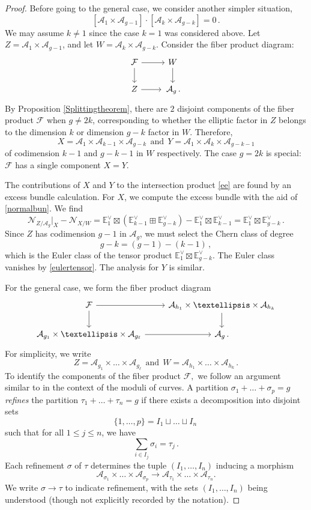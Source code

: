 \documentclass[11pt]{amsart}
\theoremstyle{definition}
\newcommand{\A}{\mathcal{A}}
\newcommand{\F}{\mathcal{F}}
\begin{document}
{\begin{proof}
Before going to the general case, we consider another simpler situation, 
\begin{equation}\label{ee}[\A_{1} \times \A_{g-1}] \cdot [\A_{k} \times \A_{g-k}] = 0\, .\end{equation} We may assume $k\neq 1$ since the case $k=1$ was considered above. Let $Z = \A_{1} \times \A_{g-1}$, and let $W =\A_{k} \times \A_{g-k}$. 
Consider the fiber product diagram:
\[
\begin{tikzcd}
\F \arrow[d] \arrow[r] & W\arrow[d] \\
Z \arrow[r]       & \, \A_g \, .                       
\end{tikzcd}
\]
 By Proposition \ref{Splittingtheorem}, there are $2$ disjoint components of the fiber product $\F$ when $g\neq 2k$, corresponding to whether the elliptic factor in $Z$ belongs to the dimension $k$ or dimension $g-k$ factor in $W$. Therefore, $$X=\A_{1}\times \A_{k-1}\times \A_{g-k} \ \  \text{and}\ \  Y=\A_{1}\times \A_{k}\times \A_{g-k-1}$$ of codimension $k-1$ and $g-k-1$ in $W$ respectively. The case $g=2k$ is special: $\F$ has a single component $X=Y$.

The contributions of $X$ and $Y$ to the intersection product \eqref{ee} are found by an excess bundle calculation. For $X$, we compute the excess bundle with the aid of \eqref{normalbun}. We find 
$$ \mathcal N_{Z/\A_g}\bigg|_X - \mathcal N_{X/W} = \mathbb E^{\vee}_1 \boxtimes (\mathbb E^{\vee}_{k-1} \boxplus\mathbb E^{\vee}_{g-k}) -\mathbb E^{\vee}_1 \boxtimes \mathbb E^{\vee}_{k-1} = \mathbb E^{\vee}_1 \boxtimes \mathbb E^{\vee}_{g-k}\,.$$ 
Since $Z$ has codimension $g-1$ in $\A_g$,
we must select the Chern class of degree 
$$g-k=(g-1)-(k-1)\, ,$$ which is the Euler class of the tensor product $\mathbb E_1^{\vee}\boxtimes \mathbb E_{g-k}^{\vee}$.
The Euler class vanishes by \eqref{eulertensor}. The analysis for $Y$ is similar. 


For the general case, we form the fiber product diagram \[
\begin{tikzcd}
\mathcal F\arrow[d] \arrow[r] & \A_{h_1}\times \ldots \times\A_{h_k}\arrow[d] \\
\A_{g_1} \times \ldots \times\A_{g_\ell}\arrow[r]       & \A_g \, .                       
\end{tikzcd}
\] For simplicity, we write $$Z=\A_{g_1} \times \ldots\times \A_{g_\ell}\ \ \text{and}\ \  W=\A_{h_1}\times \ldots \times \A_{h_k}\, .$$ To identify the components of the fiber product $\mathcal F,$ we follow an argument similar to \cite [Proposition 9]{GP} in the context of the moduli of curves. A partition  $\sigma_1+\ldots+\sigma_p=g$ {\em refines} the partition $\tau_1+\ldots+\tau_n = g$ if there exists a decomposition into disjoint sets $$\{1, \ldots, p\}=I_1\sqcup \ldots \sqcup I_{n}\,$$ such that for all $1\leq j\leq n$, we have $$\sum_{i\in I_{j}} \sigma_i = \tau_j\,.$$ Each refinement $\sigma$ of $\tau$ determines the tuple $(I_1, \ldots, I_n)$ inducing a morphism $$\A_{\sigma_1}\times \ldots \times \A_{\sigma_{p}}\to \A_{\tau_1} \times \ldots \times \A_{\tau_n}.$$ We write $\sigma\to \tau$ to indicate refinement, with the sets $(I_1, \ldots, I_n)$ being understood (though not explicitly recorded by the notation). 


\end{proof}}
\end{document}
